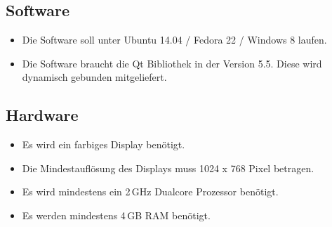 \subsection{Software}
\begin{itemize}
\item Die Software soll unter Ubuntu 14.04 / Fedora 22 / Windows 8 laufen. 
\item Die Software braucht die \gls{Qt} Bibliothek in der Version 5.5. Diese wird dynamisch gebunden mitgeliefert.
\end{itemize}
\subsection{Hardware}
\begin{itemize}
\item Es wird ein farbiges Display benötigt. 
\item Die Mindestauflösung des Displays muss 1024 x 768 Pixel betragen.
\item Es wird mindestens ein 2\,GHz Dualcore Prozessor benötigt.
\item Es werden mindestens 4\,GB RAM benötigt.
\end{itemize}
\pagebreak
